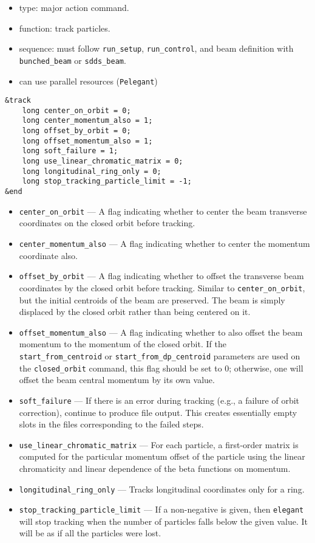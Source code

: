 \documentclass[11pt]{article}
\begin{document}
\begin{itemize}
\item type: major action command.
\item function: track particles.
\item sequence: must follow \verb|run_setup|, \verb|run_control|, and beam definition with \verb|bunched_beam| or \verb|sdds_beam|.
\item can use parallel resources (\verb|Pelegant|)
\end{itemize}

\begin{verbatim}
&track
    long center_on_orbit = 0;
    long center_momentum_also = 1;
    long offset_by_orbit = 0;
    long offset_momentum_also = 1;
    long soft_failure = 1;
    long use_linear_chromatic_matrix = 0;
    long longitudinal_ring_only = 0;
    long stop_tracking_particle_limit = -1;
&end
\end{verbatim}

\begin{itemize}
\item \verb|center_on_orbit| --- A flag indicating whether to center
the beam transverse coordinates on the closed orbit before tracking.
\item \verb|center_momentum_also| --- A flag indicating whether to
center the momentum coordinate also.
\item \verb|offset_by_orbit| --- A flag indicating whether to offset
the transverse beam coordinates by the closed orbit before tracking.
Similar to \verb|center_on_orbit|, but the initial centroids of the
beam are preserved.  The beam is simply displaced by the closed orbit
rather than being centered on it.
\item \verb|offset_momentum_also| --- A flag indicating whether to also
offset the beam momentum to the momentum of the closed orbit.  If the
\verb|start_from_centroid| or \verb|start_from_dp_centroid| parameters are 
used on the \verb|closed_orbit| command, this flag should be set to
0; otherwise, one will offset the beam central momentum by its own value.
\item \verb|soft_failure| --- If there is an error during tracking (e.g.,
a failure of orbit correction), continue to produce file output.  This
creates essentially empty slots in the files corresponding to the failed
steps.
\item \verb|use_linear_chromatic_matrix| --- For each particle, a first-order
matrix is computed for the particular momentum offset 
of the particle using the linear chromaticity and linear dependence of 
the beta functions on momentum.
\item \verb|longitudinal_ring_only| --- Tracks longitudinal coordinates only
for a ring.  
\item \verb|stop_tracking_particle_limit| --- If a non-negative is given, then
{\tt elegant} will stop tracking when the number of particles falls below the
given value.  It will be as if all the particles were lost.
\end{itemize}
\end{document}
